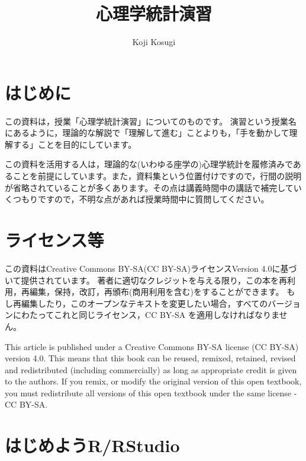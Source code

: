 \documentclass[
  a4paper,
]{ltjsbook}
\title{心理学統計演習}
\author{Koji Kosugi}
\date{}
\renewcommand*\contentsname{Table of contents}
\newcommand\contentsname{Table of contents}
\begin{document}
\maketitle

\renewcommand*\contentsname{Table of contents}
{
\hypersetup{linkcolor=}
\setcounter{tocdepth}{2}
\tableofcontents
}

\chapter{はじめに}\label{ux306fux3058ux3081ux306b}

この資料は，授業「心理学統計演習」についてのものです。
演習という授業名にあるように，理論的な解説で「理解して進む」ことよりも，「手を動かして理解する」ことを目的にしています。

この資料を活用する人は，理論的な(いわゆる座学の)心理学統計を履修済みであることを前提にしています。また，資料集という位置付けですので，行間の説明が省略されていることが多くあります。その点は講義時間中の講話で補完していくつもりですので，不明な点があれば授業時間中に質問してください。


\chapter{ライセンス等}\label{ux30e9ux30a4ux30bbux30f3ux30b9ux7b49}

この資料はCreative Commons BY-SA(CC BY-SA)ライセンスVersion
4.0に基づいて提供されています。
著者に適切なクレジットを与える限り，この本を再利用，再編集，保持，改訂，再頒布(商用利用を含む)をすることができます。
もし再編集したり，このオープンなテキストを変更したい場合，すべてのバージョンにわたってこれと同じライセンス，CC
BY-SA を適用しなければなりません。

This article is published under a Creative Commons BY-SA license (CC
BY-SA) version 4.0. This means that this book can be reused, remixed,
retained, revised and redistributed (including commercially) as long as
appropriate credit is given to the authors. If you remix, or modify the
original version of this open textbook, you must redistribute all
versions of this open textbook under the same license - CC BY-SA.


\chapter{はじめようR/RStudio}\label{ux306fux3058ux3081ux3088ux3046rrstudio}
\end{document}
